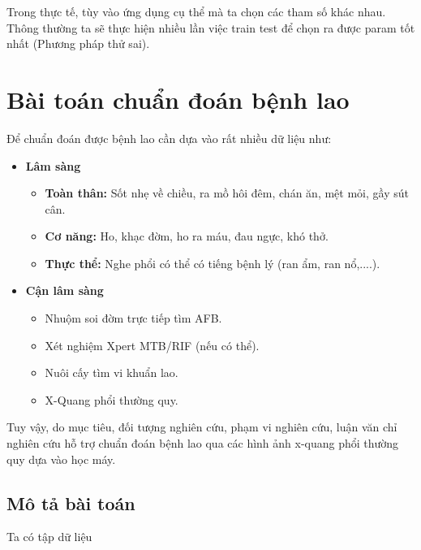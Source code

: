 Trong thực tế, tùy vào ứng dụng cụ thể mà ta chọn các tham số khác nhau. Thông thường ta sẽ thực hiện nhiều lần việc train test để chọn ra được param tốt nhất (Phương pháp thử sai).

\section{Bài toán chuẩn đoán bệnh lao}
Để chuẩn đoán được bệnh lao cần dựa vào rất nhiều dữ liệu \cite{bytchuandoanlao} như: 
\begin{itemize}
	\item {\bfseries Lâm sàng}
	\begin{itemize}
		\item {\bfseries Toàn thân:} Sốt nhẹ về chiều, ra mồ hôi đêm, chán ăn, mệt mỏi, gầy sút cân.
		\item {\bfseries Cơ năng:} Ho, khạc đờm, ho ra máu, đau ngực, khó thở.
		\item {\bfseries Thực thể:} Nghe phổi có thể có tiếng bệnh lý (ran ẩm, ran nổ,....).
	\end{itemize}
	\item {\bfseries Cận lâm sàng}
	\begin{itemize}
		\item Nhuộm soi đờm trực tiếp tìm AFB.
		\item Xét nghiệm Xpert MTB/RIF (nếu có thể).
		\item Nuôi cấy tìm vi khuẩn lao.
		\item X-Quang phổi thường quy.
	\end{itemize}
\end{itemize}

Tuy vậy, do mục tiêu, đối tượng nghiên cứu, phạm vi nghiên cứu, luận văn chỉ nghiên cứu hỗ trợ chuẩn đoán bệnh lao qua các hình ảnh x-quang phổi thường quy dựa vào học máy.

\subsection{Mô tả bài toán}
Ta có tập dữ liệu 